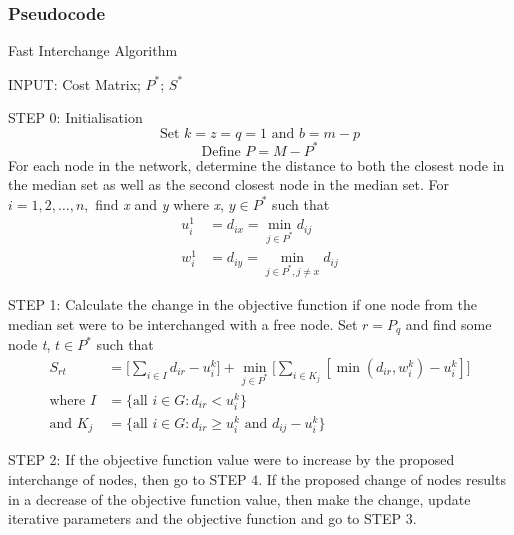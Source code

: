 \documentclass[11pt]{article}
\begin{document}
	\subsubsection{Pseudocode}
	\begin{algorithm}
		\caption{Fast Interchange Algorithm}
		\begin{algorithmic}[0]
			\Statex 
			\Statex INPUT: Cost Matrix; $P^*$; $S^*$
			
			\Statex 
			\Statex STEP 0: Initialisation
			\begin{equation*}
			\text{Set } k = z = q = 1 \text{ and } b=m-p
			\end{equation*}
			\begin{equation*}
			\text{Define } P=M-P^*
			\end{equation*}
			\Statex For each node in the network, determine the distance to both the closest node in the median set as well as the second closest node in the median set.
			\Statex For $i=1,2,\dots,n ,$ find \emph{x} and \emph{y} where \emph{x}, $y \in P^*$ such that
			\begin{align*}
			u_i^1 & = d_{ix} = \min_{j\in P^*}d_{ij}\\
			w_i^1 & = d_{iy} = \min_{j\in P^*, j\neq x}d_{ij}
			\end{align*}
			
			
			\Statex
			\Statex STEP 1: Calculate the change in the objective function if one node from the median set were to be interchanged with a free node.
			\Statex Set $r=P_q$ and find some node \emph{t}, $t \in P^*$ such that
			\begin{align*}
			S_{rt} &= \bigg[\sum_{i \in I}d_{ir}-u_i^k\bigg] + \min_{j\in P^*}\bigg[\sum_{i \in K_j}[\min(d_{ir}, w_i^k)-u_i^k]\bigg]\\
			\text{where } I &= \{\text{all } i \in G: d_{ir}<u_i^k\}\\
			\text{and } K_j &= \{\text{all } i \in G: d_{ir}\geq u_i^k\text{ and } d_{ij} - u_i^k\}
			\end{align*}


			\Statex
			\Statex STEP 2: If the objective function value were to increase by the proposed interchange of nodes, then go to STEP 4.  If the proposed change of nodes results in a decrease of the objective function value, then make the change, update iterative parameters and the objective function and go to STEP 3.
			\Statex	
				\Statex	
			\end{algorithmic}
		\end{algorithm}
		
\end{document}
